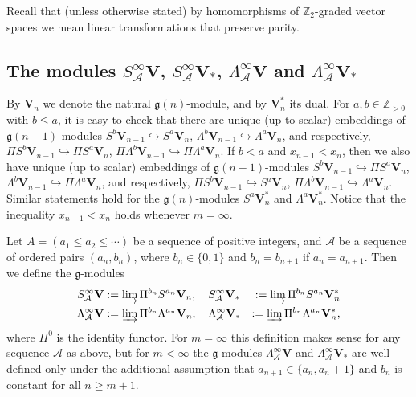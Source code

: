 \documentclass[12pt]{amsart}
\newcommand\Z{\mathbb{Z}}
\newcommand\g{\mathfrak{g}}
\newcommand\cA{\mathcal{A}}
\newcommand\bV{\mathbf{V}}
\theoremstyle{plain}
\theoremstyle{definition}
\numberwithin{equation}{section}
\begin{document}
Recall that  (unless otherwise stated) by homomorphisms of $\Z_{2}$-graded vector spaces we mean linear transformations that preserve parity.

\subsection*{The modules $S_\cA^\infty \bV$, $S_\cA^\infty \bV_*$, $\Lambda_\cA^\infty \bV$ and $\Lambda_\cA^\infty \bV_*$} By $\bV_{n}$ we denote the natural $\g(n)$-module, and by $\bV_{n}^*$ its dual. For $a,b\in \Z_{>0}$ with $b\leq a$, it is easy to check that there are unique (up to scalar) embeddings of $\g(n-1)$-modules $S^b\bV_{n-1}\hookrightarrow S^a\bV_n$, $\Lambda^b\bV_{n-1}\hookrightarrow \Lambda^a\bV_n$, and respectively, $\Pi S^b\bV_{n-1}\hookrightarrow \Pi S^a\bV_n$, $\Pi \Lambda^b\bV_{n-1}\hookrightarrow \Pi \Lambda^a\bV_n$. If $b<a$ and $x_{n-1}<x_n$, then we also have unique (up to scalar) embeddings of $\g(n-1)$-modules $S^b\bV_{n-1}\hookrightarrow \Pi S^a\bV_n$, $\Lambda^b\bV_{n-1}\hookrightarrow \Pi \Lambda^a\bV_n$, and respectively, $\Pi S^b\bV_{n-1}\hookrightarrow S^a\bV_n$, $\Pi \Lambda^b\bV_{n-1}\hookrightarrow \Lambda^a\bV_n$. Similar statements hold for the $\g(n)$-modules $S^a \bV_{n}^*$ and $\Lambda^a \bV_{n}^*$. Notice that the inequality $x_{n-1}<x_n$ holds whenever $m=\infty$.

Let $A = (a_1\leq a_2\leq \cdots)$ be a sequence of positive integers, and $\cA$ be a sequence of ordered pairs $(a_n,b_n)$, where $b_n\in \{0,1\}$ and $b_n = b_{n+1}$ if $a_n = a_{n+1}$. Then we define the $\g$-modules
\begin{eqnarray*}
S_\cA^\infty \bV & :=\varinjlim \Pi^{b_n} S^{a_n}\bV_n, \quad S_\cA^\infty \bV_* & :=\varinjlim \Pi^{b_n} S^{a_n}\bV_n^* \\
\Lambda_\cA^{\infty} \bV & :=\varinjlim \Pi^{b_n} \Lambda^{a_n}\bV_n, \quad \Lambda_\cA^{\infty} \bV_* & :=\varinjlim \Pi^{b_n} \Lambda^{a_n}\bV_n^*,
\end{eqnarray*}
where $\Pi^0$ is the identity functor. For $m=\infty$ this definition makes sense for any sequence $\cA$ as above, but for $m<\infty$ the $\g$-modules $\Lambda_\cA^{\infty} \bV$ and $\Lambda_\cA^{\infty} \bV_*$ are well defined only under the additional assumption that $a_{n+1}\in \{a_n, a_n+1\}$ and $b_n$ is constant for all $n\geq m+1$.
\end{document}
